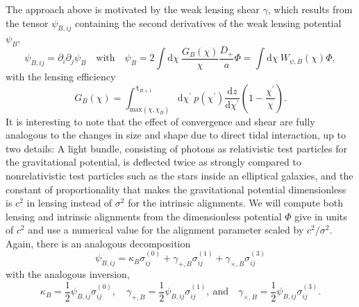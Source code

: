 \documentclass[a4paper,fleqn,usenatbib]{mnras}
\newcommand{\dd}{\mathrm{d}}
\begin{document}
The approach above is motivated by the weak lensing shear $\gamma$, which results from the tensor $\psi_{B,ij}$ containing the second derivatives of the weak lensing potential $\psi_B$,
\begin{equation}
\psi_{B,ij} = \partial_i\partial_j\psi_B
\quad\mathrm{with}\quad
\psi_B = 2\int\dd\chi\:\frac{G_B(\chi)}{\chi}\frac{D_+}{a}\Phi = \int\dd\chi\:W_{\psi,B}(\chi)\Phi,
\end{equation}
with the lensing efficiency
\begin{equation}
G_B(\chi) = \int_{\mathrm{max}(\chi,\chi_B)}^{\chi_{B+1}}\dd\chi^\prime\:p(\chi^\prime)\frac{\dd z}{\dd\chi^\prime}\left(1-\frac{\chi^\prime}{\chi}\right).
\end{equation}
It is interesting to note that the effect of convergence and shear are fully analogous to the changes in size and shape due to direct tidal interaction, up to two details: A light bundle, consisting of photons as relativistic test particles for the gravitational potential, is deflected twice as strongly compared to nonrelativistic test particles such as the stars inside an elliptical galaxies, and the constant of proportionality that makes the gravitational potential dimensionless is $c^2$ in lensing instead of $\sigma^2$ for the intrinsic alignments. We will compute both lensing and intrinsic alignments from the dimensionless potential $\Phi$ give in units of $c^2$ and use a numerical value for the alignment parameter scaled by $c^2/\sigma^2$. Again, there is an analogous decomposition
\begin{equation}
\psi_{B,ij} = \kappa_B\sigma^{(0)}_{ij} + \gamma_{+,B}\sigma^{(1)}_{ij} +\gamma_{\times,B}\sigma^{(3)}_{ij}
\end{equation}
with the analogous inversion,
\begin{equation}
\kappa_B = \frac{1}{2}\psi_{B,ij}\sigma^{(0)}_{ij},
\quad
\gamma_{+,B} = \frac{1}{2}\psi_{B,ij}\sigma^{(1)}_{ij},
\mathrm{~and}\quad
\gamma_{\times,B} = \frac{1}{2}\psi_{B,ij}\sigma^{(3)}_{ij}.
\end{equation}
\end{document}
